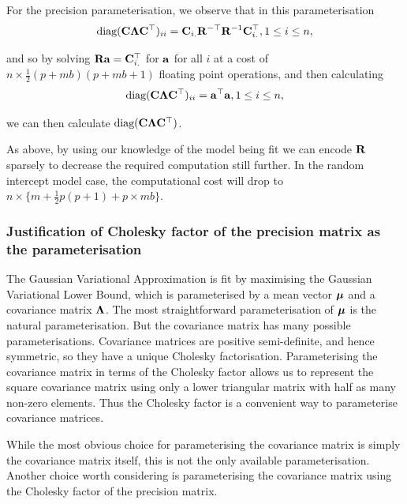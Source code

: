 	
For the precision parameterisation, we observe that in this parameterisation
\begin{equation}
	\text{diag}({\bf C} {\boldsymbol \Lambda} {\bf C}^\top)_{ii} = {\bf C}_{i .} {\bf R}^{-\top} {\bf R}^{-1} {\bf C}_{i .}^\top, 1 \leq i \leq n,
\end{equation}
	
\noindent and so by solving ${\bf R} {\bf a} = {\bf C}_{i .}^\top$ for ${\bf a}$ for all $i$ at a cost of $n \times
\frac{1}{2} (p + m b) (p + m b + 1)$ floating point operations, and then calculating
\begin{equation}
	\text{diag}({\bf C} {\boldsymbol \Lambda} {\bf C}^\top)_{ii} = {\bf a}^\top {\bf a}, 1 \leq i \leq n,
\end{equation}
	
\noindent we can then calculate $\text{diag}({\bf C} {\boldsymbol \Lambda} {\bf C}^\top)$.
	
As above, by using our knowledge of the model being fit we can encode ${\bf R}$ sparsely to decrease the required
computation still further. In the random intercept model case, the computational cost will drop to $n \times
\{m + \frac{1}{2} p (p + 1) + p \times m b\}$.
			
\subsubsection{Justification of Cholesky factor of the precision matrix as the parameterisation}
The Gaussian Variational Approximation is fit by maximising the Gaussian Variational Lower Bound, which is
parameterised by a mean vector ${\boldsymbol \mu}$ and a covariance matrix ${\boldsymbol \Lambda}$. The most straightforward
parameterisation of ${\boldsymbol \mu}$ is the natural parameterisation. But the covariance matrix has many possible
parameterisations. Covariance matrices are positive semi-definite, and hence symmetric, so they have a unique
Cholesky factorisation. Parameterising the covariance matrix in terms of the Cholesky factor allows us to
represent the square covariance matrix using only a lower triangular matrix with half as many non-zero
elements. Thus the Cholesky factor is a convenient way to parameterise covariance matrices.

While the most obvious choice for parameterising the covariance matrix is simply the covariance matrix itself,
this is not the only available parameterisation. Another choice worth considering is parameterising the
covariance matrix using the Cholesky factor of the precision matrix.

